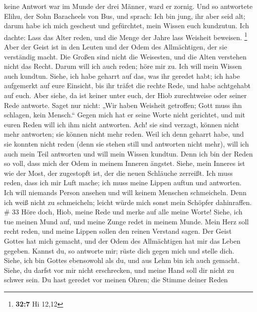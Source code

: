 keine Antwort war im Munde der drei Männer, ward er zornig. 
Und so antwortete Elihu, der Sohn Baracheels von Bus, und sprach: Ich
bin jung, ihr aber seid alt; darum habe ich mich gescheut und
gefürchtet, mein Wissen euch kundzutun.  Ich dachte: Lass
das Alter reden, und die Menge der Jahre lass Weisheit beweisen.
\footnote{\textbf{32:7} Hi 12,12}  Aber der Geist ist in den
Leuten und der Odem des Allmächtigen, der sie verständig macht.
 Die Großen sind nicht die Weisesten, und die Alten
verstehen nicht das Recht.  Darum will ich auch reden; höre
mir zu. Ich will mein Wissen auch kundtun.  Siehe, ich habe
geharrt auf das, was ihr geredet habt; ich habe aufgemerkt auf eure
Einsicht, bis ihr träfet die rechte Rede,  und habe
achtgehabt auf euch. Aber siehe, da ist keiner unter euch, der Hiob
zurechtweise oder seiner Rede antworte.  Saget nur nicht:
„Wir haben Weisheit getroffen; Gott muss ihn schlagen, kein Mensch.``
 Gegen mich hat er seine Worte nicht gerichtet, und mit
euren Reden will ich ihm nicht antworten.  Ach! sie sind
verzagt, können nicht mehr antworten; sie können nicht mehr reden.
 Weil ich denn geharrt habe, und sie konnten nicht reden
(denn sie stehen still und antworten nicht mehr),  will ich
auch mein Teil antworten und will mein Wissen kundtun. 
Denn ich bin der Reden so voll, dass mich der Odem in meinem Inneren
ängstet.  Siehe, mein Inneres ist wie der Most, der
zugestopft ist, der die neuen Schläuche zerreißt.  Ich muss
reden, dass ich mir Luft mache; ich muss meine Lippen auftun und
antworten.  Ich will niemands Person ansehen und will
keinem Menschen schmeicheln.  Denn ich weiß nicht zu
schmeicheln; leicht würde mich sonst mein Schöpfer dahinraffen. \# 33
 Höre doch, Hiob, meine Rede und merke auf alle meine Worte!
 Siehe, ich tue meinen Mund auf, und meine Zunge redet in
meinem Munde.  Mein Herz soll recht reden, und meine Lippen
sollen den reinen Verstand sagen.  Der Geist Gottes hat mich
gemacht, und der Odem des Allmächtigen hat mir das Leben gegeben.
 Kannst du, so antworte mir; rüste dich gegen mich und
stelle dich.  Siehe, ich bin Gottes ebensowohl als du, und
aus Lehm bin ich auch gemacht.  Siehe, du darfst vor mir
nicht erschrecken, und meine Hand soll dir nicht zu schwer sein.
 Du hast geredet vor meinen Ohren; die Stimme deiner Reden
